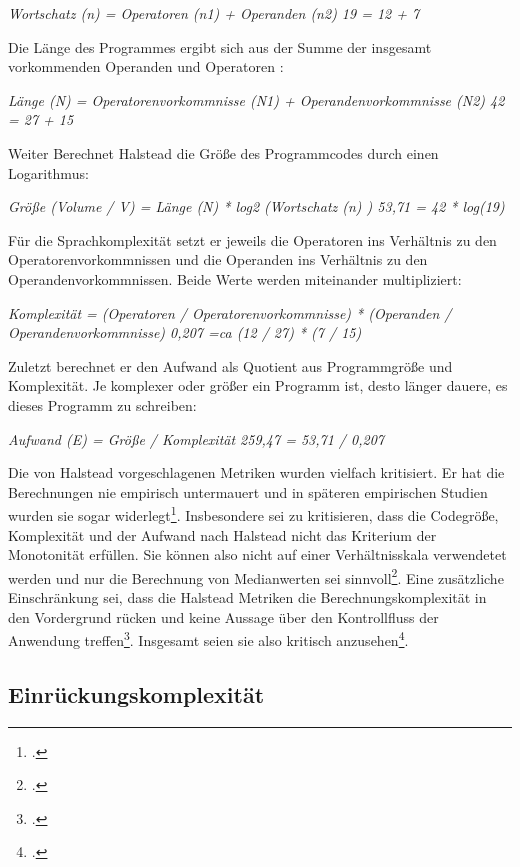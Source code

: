 \emph{Wortschatz (n) = Operatoren (n1) + Operanden (n2) 19 = 12 + 7}

Die Länge des Programmes ergibt sich aus der Summe der insgesamt
vorkommenden Operanden und Operatoren :

\emph{Länge (N) = Operatorenvorkommnisse (N1) + Operandenvorkommnisse
(N2) 42 = 27 + 15}

Weiter Berechnet Halstead die Grö\ss e des Programmcodes durch einen
Logarithmus:

\emph{Grö\ss e (Volume / V) = Länge (N) * log2 (Wortschatz (n) ) 53,71 = 42
* log(19)}

Für die Sprachkomplexität setzt er jeweils die Operatoren ins Verhältnis
zu den Operatorenvorkommnissen und die Operanden ins Verhältnis zu den
Operandenvorkommnissen. Beide Werte werden miteinander multipliziert:

\emph{Komplexität = (Operatoren / Operatorenvorkommnisse) * (Operanden /
Operandenvorkommnisse) 0,207 =ca (12 / 27) * (7 / 15)}

Zuletzt berechnet er den Aufwand als Quotient aus Programmgrö\ss e und
Komplexität. Je komplexer oder grö\ss er ein Programm ist, desto länger
dauere, es dieses Programm zu schreiben:

\emph{Aufwand (E) = Grö\ss e / Komplexität 259,47 = 53,71 / 0,207}

Die von Halstead vorgeschlagenen Metriken wurden vielfach kritisiert. Er
hat die Berechnungen nie empirisch untermauert und in späteren
empirischen Studien wurden sie sogar widerlegt\footcite[Vgl. ][S. 185]{sneedSoftwareZahlenVermessung2010}. Insbesondere sei zu kritisieren, dass die Codegrö\ss e,
Komplexität und der Aufwand nach Halstead nicht das Kriterium der
Monotonität erfüllen. Sie können also nicht auf einer Verhältnisskala
verwendetet werden und nur die Berechnung von Medianwerten sei
sinnvoll\footcite[Vgl. ][S. 142]{zuseSoftwareComplexityMeasures1991}. Eine zusätzliche Einschränkung
sei, dass die Halstead Metriken die Berechnungskomplexität in den
Vordergrund rücken und keine Aussage über den Kontrollfluss der
Anwendung treffen\footcite[Vgl. ][S. 2]{rumreichExaminingSoftwareDesign2019}. Insgesamt seien sie also kritisch anzusehen\footcite[Vgl. ][S. 185]{sneedSoftwareZahlenVermessung2010}.


\subsection{Einrückungskomplexität}\label{Einruckungskomplexitat}

